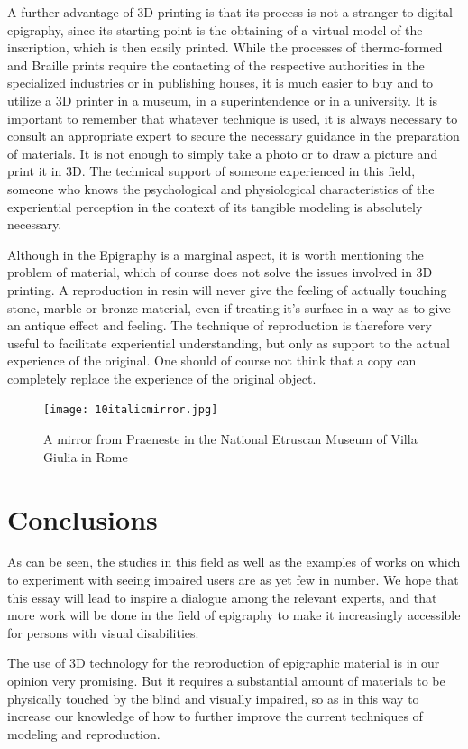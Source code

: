 \documentclass[amsthm,ebook]{saparticle}
\begin{document}
A further advantage of 3D printing is that its process is not a stranger to digital epigraphy, since its starting point
is the obtaining of a virtual model of the inscription, which is then easily printed. While the processes of
thermo-formed and Braille prints require the contacting of the respective authorities in the specialized industries or
in publishing houses, it is much easier to buy and to utilize a 3D printer in a museum, in a superintendence or in a
university. It is important to remember that whatever technique is used, it is always necessary to consult an
appropriate expert to secure the necessary guidance in the preparation of materials. It is not enough to simply take a
photo or to draw a picture and print it in 3D. The technical support of someone experienced in this field, someone who
knows the psychological and physiological characteristics of the experiential perception in the context of its tangible
modeling is absolutely necessary.

Although in the Epigraphy is a marginal aspect, it is worth mentioning the problem of material, which of course does not
solve the issues involved in 3D printing. A reproduction in resin will never give the feeling of actually touching
stone, marble or bronze material, even if treating it’s surface in a way as to give an antique effect and feeling. The
technique of reproduction is therefore very useful to facilitate experiential understanding, but only as support to the
actual experience of the original. One should of course not think that a copy can completely replace the experience of
the original object.



\begin{figure}[!hbp]
\centering
 \texttt{[image: 10italicmirror.jpg]}
\caption{A mirror from Praeneste  in the National Etruscan Museum of Villa Giulia in Rome}
\label{fig:10}
\end{figure}




\section{Conclusions}
\noindent As can be seen, the studies in this field as well as the examples of works on which to experiment with seeing impaired
users are as yet few in number. We hope that this essay will lead to inspire a dialogue among the relevant experts, and
that more work will be done in the field of epigraphy to make it increasingly accessible for persons with visual
disabilities.

The use of 3D technology for the reproduction of epigraphic material is in our opinion very promising. But it requires a
substantial amount of materials to be physically touched by the blind and visually impaired, so as in this way to
increase our knowledge of how to further improve the current techniques of modeling and reproduction.

\nocite{accessibilita,Bellini2000,Cetorelli2004,Hersh2008,Jansson2003,Levi2015,Velestino2007}




\end{document}
